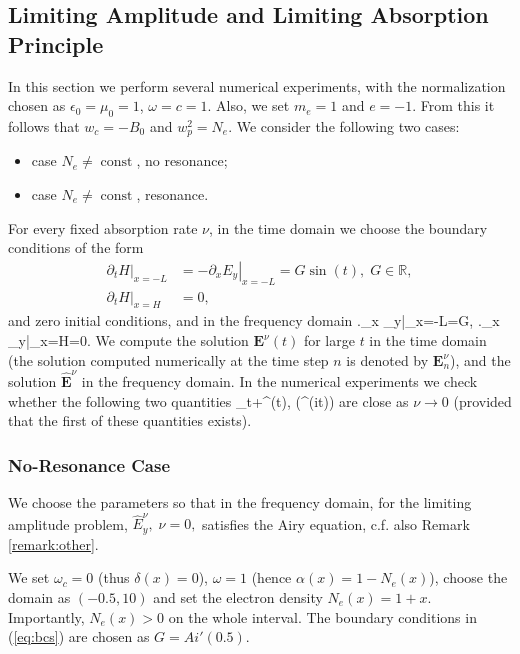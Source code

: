 \subsection{Limiting Amplitude and Limiting Absorption Principle}
In this section we perform several numerical experiments,
with the normalization chosen as $\epsilon_0=\mu_0=1$, $\omega=c=1$. 
Also, we set $m_e=1$ and $e=-1$. From this it follows that $w_c=-B_0$ and $w_p^2=N_e$. 
We consider the following two cases:
\begin{itemize}
 \item case $N_e\neq \operatorname{const}$, no resonance;
 \item case $N_e\neq \operatorname{const}$, resonance.
\end{itemize}
For every fixed absorption rate $\nu$, in the time domain we choose the boundary conditions of the form
\begin{align}
\label{eq:bcs}
\left.\partial_t H\right|_{x=-L}&=-\left.\partial_x E_y\right|_{x=-L}=G\sin(t),\; G\in \mathbb{R}, \\
 \nonumber
 \left.\partial_t H\right|_{x=H}&=0,
\end{align}
and zero initial conditions, and in the frequency domain
\bealn
 \left.\partial_x _y\right|_{x=-L}=G,\; \left.\partial_x _y\right|_{x=H}=0.
\eealn
We compute the solution $\mathbf{E}^{\nu}(t)$ for large $t$ in the time domain (the solution computed numerically at the time step $n$ is denoted by $\mathbf{E}^{\nu}_{n}$), and the solution $\hat{\mathbf{E}}^{\nu}$ in the frequency domain. 
In the numerical experiments we check whether the following two quantities
\ben
\lim_{t\rightarrow+\infty}^{\nu}(t),  \Im\left(^{\nu}\exp(it)\right)
\een
are close as $\nu\rightarrow 0$ (provided that the first of these quantities exists). 
\subsubsection{No-Resonance Case}
We choose the parameters so that in the frequency domain, for the limiting amplitude problem, $\hat{E}_{y}^{\nu},\; \nu=0,$ satisfies 
the Airy equation, c.f. also Remark \ref{remark:other}. 

We set $\omega_c=0$ (thus $\delta(x)=0$), $\omega=1$ (hence $\alpha(x)=1-N_e(x)$), 
choose the domain as $(-0.5, 10)$ and set the electron density $N_e(x)=1+x$. Importantly, $N_e(x)>0$ on the whole interval.
The boundary conditions in (\ref{eq:bcs}) are chosen as $G=Ai'(0.5)$. 

